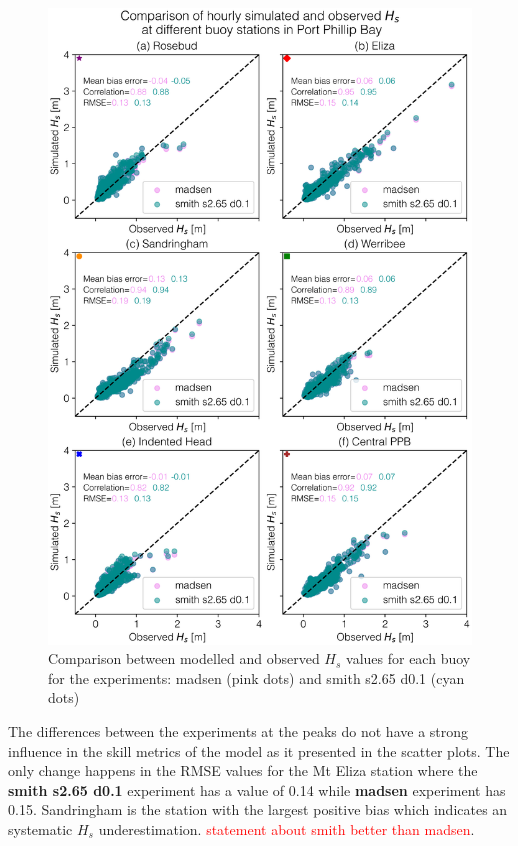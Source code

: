 \documentclass[12pt]{article}
\begin{document}
\begin{figure}[h]
    \centering
    \includegraphics[scale=0.7]{plots/scatter/madsen_vs_smith s2.65 d0.1_vert_sca.png}
    \caption{Comparison between modelled and observed $H_{s}$ values for each buoy for the experiments: madsen (pink dots) and smith s2.65 d0.1 (cyan dots) }
    \label{fig:scatter_madsen_vs_smith_def}
\end{figure}

The differences between the experiments at the peaks do not have a strong influence in the skill metrics of the model as it presented in the scatter plots. The only change happens in the RMSE values for the Mt Eliza station where the \textbf{smith s2.65 d0.1} experiment has a value of 0.14 while \textbf{madsen} experiment has 0.15. Sandringham is the station with the largest positive bias which indicates an systematic $H_s$ underestimation. \textcolor{red}{statement about smith better than madsen}.\\
\end{document}
